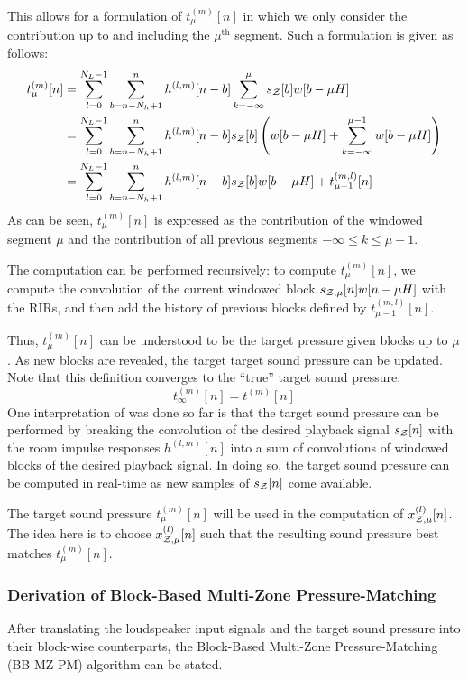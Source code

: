 This allows for a formulation of $t_\mu^{(m)}[n]$ in which we only consider the contribution up to and including the $\mu^\text{th}$ segment.  
Such a formulation is given as follows:
\begin{align}
    t_\mu^{(m)}[n] &= \sum_{l=0}^{N_L - 1} \sum_{b = n - N_h + 1}^{n} h^{(l,m)}[n - b] \sum_{k=-\infty}^{\mu} s_{\mathcal{Z}}[b] w[b - \mu H]\\
                   &= \sum_{l=0}^{N_L - 1} \sum_{b = n - N_h + 1}^{n} h^{(l,m)}[n - b] s_{\mathcal{Z}}[b]\left(w[b - \mu H] + \sum_{k=-\infty}^{\mu - 1} w[b - \mu H] \right)\\
                   &= \sum_{l=0}^{N_L - 1} \sum_{b = n - N_h + 1}^{n} h^{(l,m)}[n - b] s_{\mathcal{Z}}[b] w[b - \mu H] + t_{\mu - 1}^{(m,l)}[n]
\end{align}
As can be seen, $t_\mu^{(m)}[n]$ is expressed as the contribution of the windowed segment $\mu$ and the contribution of all previous segments $-\infty \leq k \leq \mu - 1$.

The computation can be performed recursively:
to compute $t_\mu^{(m)}[n]$, we compute the convolution of the current windowed block $s_{\mathcal{Z},\mu}[n]w[n - \mu H]$ with the RIRs, 
and then add the history of previous blocks defined by $t_{\mu - 1}^{(m,l)}[n]$.

Thus, $t_\mu^{(m)}[n]$ can be understood to be the target pressure given blocks up to $\mu$. 
As new blocks are revealed, the target target sound pressure can be updated.
Note that this definition converges to the ``true'' target sound pressure:
\begin{equation}
    t_\infty^{(m)}[n] = t^{(m)}[n]  
\end{equation}
One interpretation of was done so far is that the target sound pressure can be performed by
breaking the convolution of the desired playback signal $s_{\mathcal{Z}}[n]$ with the room impulse responses $h^{(l,m)}[n]$
into a sum of convolutions of windowed blocks of the desired playback signal.
In doing so, the target sound pressure can be computed in real-time as new samples of $s_{\mathcal{Z}}[n]$ come available.

The target sound pressure $t_\mu^{(m)}[n]$ will be used in the computation of $x^{(l)}_{\mathcal{Z},\mu}[n]$.
The idea here is to choose $x^{(l)}_{\mathcal{Z},\mu}[n]$ such that the resulting sound pressure best matches $t_\mu^{(m)}[n]$.

\subsubsection*{Derivation of Block-Based Multi-Zone Pressure-Matching}
After translating the loudspeaker input signals and the target sound pressure into their block-wise counterparts, 
the Block-Based Multi-Zone Pressure-Matching (BB-MZ-PM) algorithm can be stated.

